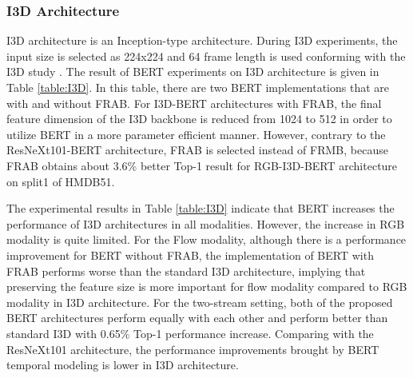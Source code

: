 \documentclass[runningheads]{llncs}
\begin{document}
\subsubsection{I3D Architecture}
I3D architecture is an Inception-type architecture. During I3D experiments, the input size is selected as 224x224 and 64 frame length is used conforming with the I3D study \cite{Carreira2017}. The result of BERT experiments on I3D architecture is given in Table \ref{table:I3D}. In this table, there are two BERT implementations that are with and without FRAB. For I3D-BERT architectures with FRAB, the final feature dimension of the I3D backbone is reduced from 1024 to 512 in order to utilize BERT in a more parameter efficient manner. However, contrary to the ResNeXt101-BERT architecture, FRAB is selected instead of FRMB, because FRAB obtains about 3.6\% better Top-1 result for RGB-I3D-BERT architecture on split1 of HMDB51.

The experimental results in Table \ref{table:I3D} indicate that BERT increases the performance of I3D architectures in all modalities. However, the increase in RGB modality is quite limited. For the Flow modality, although there is a performance improvement for BERT without FRAB, the implementation of BERT with FRAB performs worse than the standard I3D architecture, implying that preserving the feature size is more important for flow modality compared to RGB modality in I3D architecture. For the two-stream setting, both of the proposed BERT architectures perform equally with each other and perform better than standard I3D with 0.65\% Top-1 performance increase. Comparing with the ResNeXt101 architecture, the performance improvements brought by BERT temporal modeling is lower in I3D architecture. 
\end{document}
